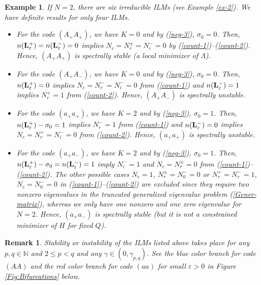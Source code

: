 \documentclass[12pt,reqno]{amsart}
\newtheorem{remark}{Remark}
\newtheorem{example}{Example}
\begin{document}
\begin{example}
		\label{ex-stable-2}
	If $N = 2$, there are six irreducible ILMs (see Example \ref{ex-2}). We have definite results for only four ILMs.
\begin{itemize}
		\item For the code $(A_+A_+)$, we have $K = 0$ and by (\ref{neg-3}), $\sigma_0 = 0$. Then, $n({\bf L}^+_\varepsilon) = n({\bf L}^-_\varepsilon) = 0$ implies $N_c = N_r^{\pm} = N_i^- = 0$ by (\ref{count-1})--(\ref{count-2}). Hence, $(A_+A_+)$ is spectrally  stable (a local minimizer of $\Lambda$).
		
		\item For the code $(A_+A_-)$, we have $K = 0$ and by (\ref{neg-3}), $\sigma_0 = 0$. Then, $n({\bf L}^+_\varepsilon) = 0$ implies $N_c = N_r^- = N_i^- = 0$ from (\ref{count-1}) and $n({\bf L}^-_\varepsilon) = 1$ implies $N_r^+ = 1$ from (\ref{count-2}). Hence, $(A_+A_-)$ is spectrally unstable. 
		
		\item For the code $(a_+a_+)$, we have $K = 2$ and by (\ref{neg-3}), $\sigma_0 = 1$. Then, $n({\bf L}^+_\varepsilon) - \sigma_0 = 1$ 
		implies $N_r^- = 1$ from (\ref{count-1}) and $n({\bf L}^-_\varepsilon) = 0$ implies  $N_c = N_r^+ = N_i^- = 0$ from (\ref{count-2}).  Hence, $(a_+a_+)$ is spectrally unstable. 
		
		\item For the code $(a_+a_-)$, we have $K = 2$ and by (\ref{neg-3}), $\sigma_0 = 1$. Then, $n({\bf L}^+_\varepsilon) - \sigma_0 = n({\bf L}^-_\varepsilon) = 1$ imply $N_i^- = 1$ and $N_c = N_r^{\pm} = 0$ from (\ref{count-1})--(\ref{count-2}). The other possible cases 
		$N_c = 1$, $N_r^{\pm} = N_0^- = 0$ or $N_r^+ = N_r^- = 1$, $N_c = N_0^- = 0$ in (\ref{count-1})--(\ref{count-2}) are excluded since they require two nonzero eigenvalues in the truncated generalized eigenvalue problem (\ref{Gener-matrix}), whereas we only have one nonzero and one zero eigenvalue for $N = 2$. Hence, 
		$(a_+a_-)$ is spectrally stable (but it is not a constrained minimizer of $H$ for fixed $Q$).
\end{itemize} 
\end{example}
%
\begin{remark}
	Stability or instability of the ILMs listed above takes place  for any $p,q\in \mathbb{N}$ and $2 \leq p < q$ and any $\gamma \in (0,\gamma_{{p,q}})$. See the blue color branch for code $(AA)$ and the red color branch for code $(aa)$ for small $\varepsilon > 0$ in Figure \ref{Fig:Bifurcations} below.
\end{remark}
\end{document}
